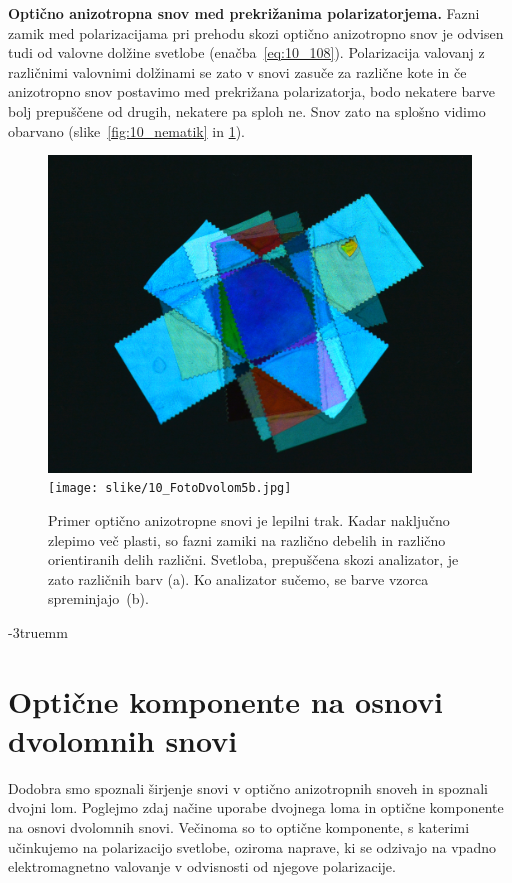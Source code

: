 \begin{example}{\bf Optično anizotropna snov med prekrižanima polarizatorjema.}
Fazni zamik med polarizacijama pri prehodu skozi optično anizotropno snov je 
odvisen tudi od valovne dolžine svetlobe (enačba~\ref{eq:10_108}). 
Polarizacija valovanj z različnimi valovnimi dolžinami se zato v snovi zasuče za različne kote 
in če anizotropno snov postavimo med prekrižana polarizatorja, bodo nekatere barve bolj prepuščene
od drugih, nekatere pa sploh ne. Snov zato na splošno vidimo obarvano 
(slike~\ref{fig:10_nematik} in \ref{fig:10_dvolom_5}).
\begin{figure}[ht]
\centering
\includegraphics[width=7truecm]{slike/10_FotoDvolom5a.jpg}\hfill
\texttt{[image: slike/10\_FotoDvolom5b.jpg]}
\caption{Primer optično anizotropne snovi je lepilni trak. Kadar naključno zlepimo več 
plasti, so fazni zamiki na različno debelih in različno orientiranih delih različni. 
Svetloba, prepuščena skozi analizator, je zato različnih barv (a). Ko analizator sučemo, 
se barve vzorca spreminjajo~(b).}
\label{fig:10_dvolom_5}
\end{figure}
\vglue-3truemm
\end{example}

\section{Optične komponente na osnovi dvolomnih snovi}
\label{chap:komponente}
Dodobra smo spoznali širjenje snovi v optično anizotropnih snoveh in spoznali dvojni lom.
Poglejmo zdaj načine uporabe dvojnega loma in optične komponente na osnovi dvolomnih snovi.
Večinoma so to optične komponente, s katerimi učinkujemo na polarizacijo
svetlobe, oziroma naprave, ki se odzivajo na vpadno elektromagnetno valovanje v odvisnosti
od njegove polarizacije.

